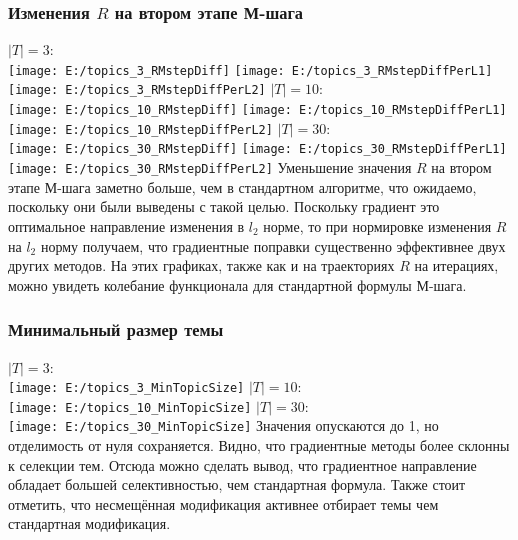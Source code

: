 \documentclass[12pt]{article}
\begin{document}
\subsubsection{Изменения $R$ на втором этапе М-шага}
$|T| = 3$:\\
\texttt{[image: E:/topics\_3\_RMstepDiff]}
\texttt{[image: E:/topics\_3\_RMstepDiffPerL1]}
\texttt{[image: E:/topics\_3\_RMstepDiffPerL2]}
$|T| = 10$:\\
\texttt{[image: E:/topics\_10\_RMstepDiff]}
\texttt{[image: E:/topics\_10\_RMstepDiffPerL1]}
\texttt{[image: E:/topics\_10\_RMstepDiffPerL2]}
$|T| = 30$:\\
\texttt{[image: E:/topics\_30\_RMstepDiff]}
\texttt{[image: E:/topics\_30\_RMstepDiffPerL1]}
\texttt{[image: E:/topics\_30\_RMstepDiffPerL2]}
Уменьшение значения $R$ на втором этапе М-шага заметно больше, чем в стандартном алгоритме, что ожидаемо, поскольку они были выведены с такой целью. Поскольку градиент это оптимальное направление изменения в $l_2$ норме, то при нормировке изменения $R$ на $l_2$ норму получаем, что градиентные поправки существенно эффективнее двух других методов. На этих графиках, также как и на траекториях $R$ на итерациях, можно увидеть колебание функционала для стандартной формулы М-шага.
\subsubsection{Минимальный размер темы}
$|T| = 3$:\\
\texttt{[image: E:/topics\_3\_MinTopicSize]}
$|T| = 10$:\\
\texttt{[image: E:/topics\_10\_MinTopicSize]}
$|T| = 30$:\\
\texttt{[image: E:/topics\_30\_MinTopicSize]}
Значения опускаются до 1, но отделимость от нуля сохраняется.  Видно, что градиентные методы более склонны к селекции тем. Отсюда можно сделать вывод, что градиентное направление обладает большей селективностью, чем стандартная формула. Также стоит отметить, что несмещённая модификация активнее отбирает темы чем стандартная модификация.
\end{document}
